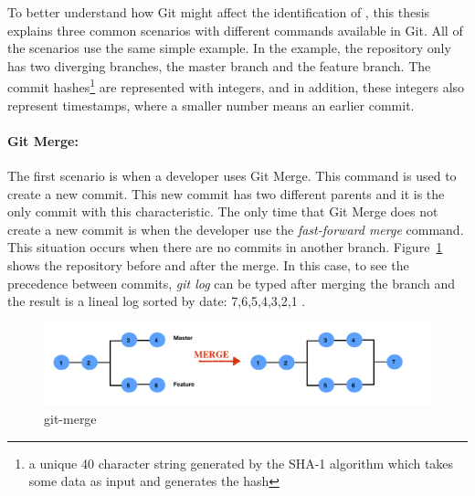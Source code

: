 \documentclass[a4paper, 12pt]{book}
\begin{document}
To better understand how Git might affect the identification of \BIC, this thesis explains three common scenarios with different commands available in Git. All of the scenarios use the same simple example. In the example, the repository only has two diverging branches, the master branch and the feature branch. The commit hashes\footnote{a unique 40 character string generated by the SHA-1 algorithm which takes some data as input and generates the hash} are represented with integers, and in addition, these integers also represent timestamps, where a smaller number means an earlier commit.

\paragraph{Git Merge:} The first scenario is when a developer uses Git Merge. This command is used to create a new commit. This new commit has two different parents and it is the only commit with this characteristic. The only time that Git Merge does not create a new commit is when the developer use the \emph{fast-forward merge} command. This situation occurs when there are no commits in another branch. Figure~\ref{fig:gitmerge} shows the repository before and after the merge. In this case, to see the precedence between commits, \emph{git log} can be typed after merging the branch and the result is a lineal log sorted by date: 7,6,5,4,3,2,1 .
\begin{figure}[ht]
\centering
\includegraphics[width=\columnwidth]{img/gitmerge.png}
\caption{git-merge}
\label{fig:gitmerge}       %
\end{figure}
\end{document}
